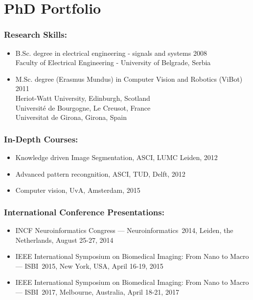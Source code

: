 %
%

\noquote
\orgchpos
\chapter*{PhD Portfolio}

\noindent

\subsection*{Research Skills:}
\vspace{1ex}
\begin{itemize}
	\item B.Sc. degree in electrical engineering - signals and systems \hfill 2008
	\\Faculty of Electrical Engineering - University of Belgrade, Serbia
	\item M.Sc. degree (Erasmus Mundus) in Computer Vision and Robotics (ViBot) \hfill 2011
	\\Heriot-Watt University, Edinburgh, Scotland
	\\Universit\'{e} de Bourgogne, Le Creusot, France
	\\Universitat de Girona, Girona, Spain
\end{itemize}

\subsection*{In-Depth Courses:}
\vspace{1ex}
\begin{itemize}
\item Knowledge driven Image Segmentation, ASCI, LUMC Leiden, 2012
\item Advanced pattern recongnition, ASCI, TUD, Delft, 2012
\item Computer vision, UvA, Amsterdam, 2015
\end{itemize}

\subsection*{International Conference Presentations:}
\vspace{1ex}
\begin{itemize}
\item INCF Neuroinformatics Congress --- Neuroinformatics~2014, Leiden, the Netherlands, August 25-27, 2014
\item IEEE International Symposium on Biomedical Imaging: From Nano to Macro --- ISBI~2015, New York, USA, April 16-19, 2015
\item IEEE International Symposium on Biomedical Imaging: From Nano to Macro --- ISBI~2017, Melbourne, Australia, April 18-21, 2017
\end{itemize}

